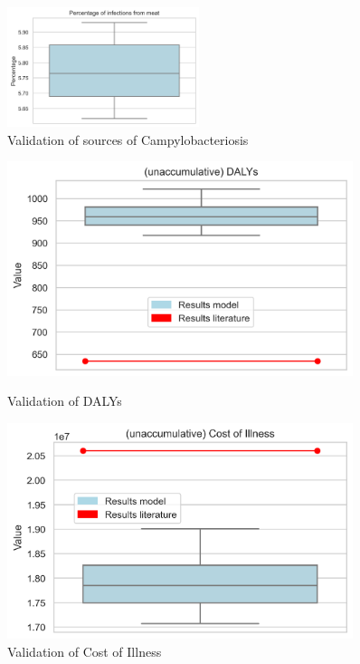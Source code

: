 \begin{figure}[!h]
	\centering
	\includegraphics[width=0.5\textwidth]{notebooks/source2.png}
	\caption{Validation of sources of Campylobacteriosis}
	\label{fig:val_sources}
\end{figure}

\begin{figure}[!h]
    \centering
    \begin{minipage}{0.45\textwidth}
        \centering
        \includegraphics[width=0.9\textwidth]{notebooks/dalys2.png} %
        \caption{Validation of DALYs}
	    \label{fig:val_dalys}
    \end{minipage}\hfill
    \begin{minipage}{0.45\textwidth}
        \centering
        \includegraphics[width=0.9\textwidth]{notebooks/coi2.png} %
        \caption{Validation of Cost of Illness}
	    \label{fig:val_coi}
    \end{minipage}
\end{figure}

